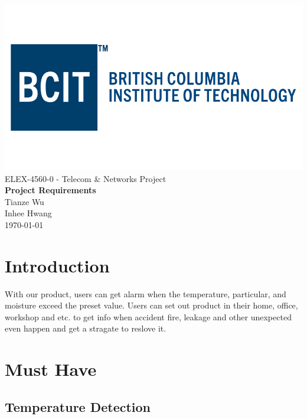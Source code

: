 \documentclass[letterpaper,12pt,notitlepage]{article}
\begin{document}
\begin{titlepage}
	\vspace{5cm}
	\begin{center}
		\includegraphics[scale=0.4]{bcit.png}\\

		\huge{ELEX-4560-0 - Telecom \& Networks Project}\\
		\vspace{10mm}
		\large{\textbf{Project Requirements}}\\
		\vspace{10mm}
		\large{Tianze Wu}\\
		\vspace{5mm}
		Inhee Hwang\\
		\vspace{5mm}
		\today

	\end{center}
\end{titlepage}


\section{Introduction}

\par With our product, users can get alarm when the temperature, particular,
and moisture exceed the preset value. Users can set out product in their home, 
office, workshop and etc. to get info when accident fire, leakage and other unexpected 
even happen and get a stragate to reslove it. 

\section{Must Have}

	\subsection{Temperature Detection}
\end{document}

